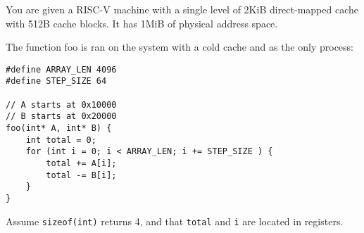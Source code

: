 \begin{blocksection}
\question
You are given a RISC-V machine with a single level of 2KiB direct-mapped cache with 512B cache blocks. It has 1MiB of physical address space.

The function foo is ran on the system with a cold cache and as the only process:

\begin{verbatim}
#define ARRAY_LEN 4096
#define STEP_SIZE 64

// A starts at 0x10000
// B starts at 0x20000
foo(int* A, int* B)	{
    int	total = 0;
    for	(int i = 0; i < ARRAY_LEN; i += STEP_SIZE ) {
        total += A[i];
        total -= B[i];
    }
}

\end{verbatim}
Assume \lstinline$sizeof(int)$ returns 4, and that \lstinline$total$ and \lstinline$i$ are located in registers.

\end{blocksection}
